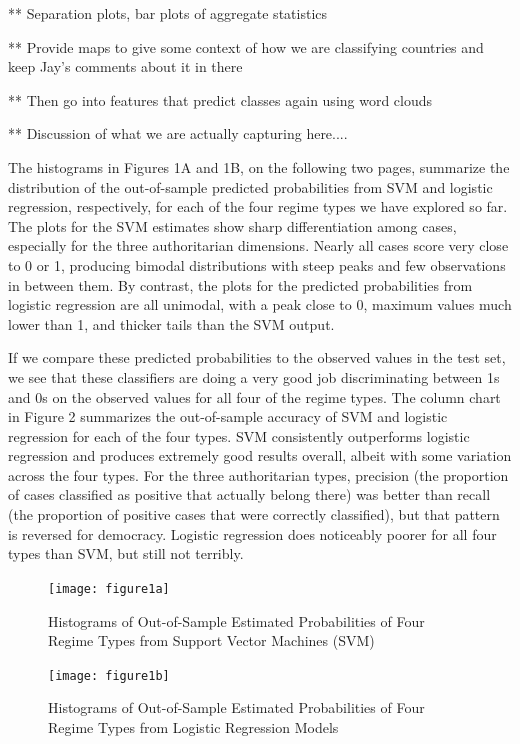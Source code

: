 \documentclass[pdftex,12pt,fullpage,oneside]{amsart}
\begin{document}
** Separation plots, bar plots of aggregate statistics

** Provide maps to give some context of how we are classifying countries and keep Jay's comments about it in there

** Then go into features that predict classes again using word clouds

** Discussion of what we are actually capturing here....

The histograms in Figures 1A and 1B, on the following two pages, summarize the distribution of the out-of-sample predicted probabilities from SVM and logistic regression, respectively, for each of the four regime types we have explored so far.  The plots for the SVM estimates show sharp differentiation among cases, especially for the three authoritarian dimensions. Nearly all cases score very close to 0 or 1, producing bimodal distributions with steep peaks and few observations in between them. By contrast, the plots for the predicted probabilities from logistic regression are all unimodal, with a peak close to 0, maximum values much lower than 1, and thicker tails than the SVM output. 

If we compare these predicted probabilities to the observed values in the test set, we see that these classifiers are doing a very good job discriminating between 1s and 0s on the observed values for all four of the regime types. The column chart in Figure 2 summarizes the out-of-sample accuracy of SVM and logistic regression for each of the four types. SVM consistently outperforms logistic regression and produces extremely good results overall, albeit with some variation across the four types. For the three authoritarian types, precision (the proportion of cases classified as positive that actually belong there) was better than recall (the proportion of positive cases that were correctly classified), but that pattern is reversed for democracy. Logistic regression does noticeably poorer for all four types than SVM, but still not terribly.

\begin{figure}[!h]
\texttt{[image: figure1a]}
\caption{Histograms of Out-of-Sample Estimated Probabilities of Four Regime Types from Support Vector Machines (SVM)}
\end{figure}

 \begin{figure}[!h]
\texttt{[image: figure1b]}
\caption{Histograms of Out-of-Sample Estimated Probabilities of Four Regime Types from Logistic Regression Models}
\end{figure}
\end{document}
